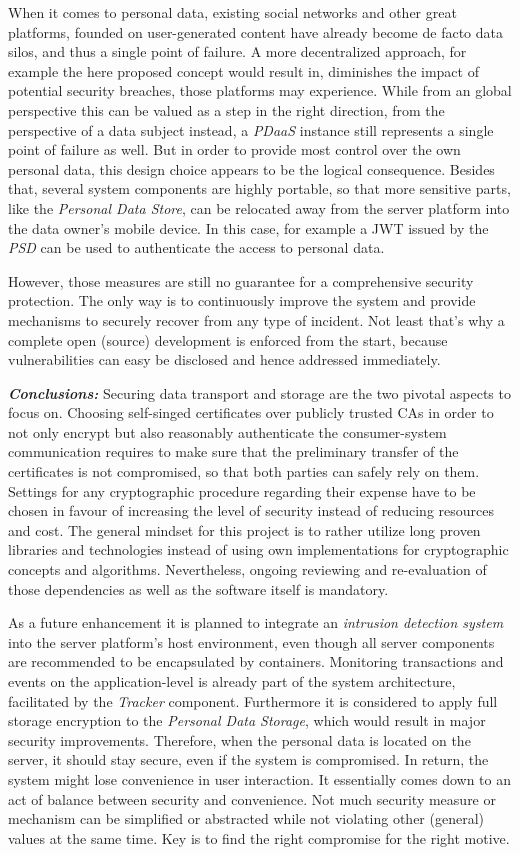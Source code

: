 \documentclass[12pt,english,a4paper,titlepage,cleardoublepage=empty,dottedtoc]{report}
\begin{document}
When it comes to personal data, existing social networks and other great
platforms, founded on user-generated content have already become de
facto data silos, and thus a single point of failure. A more
decentralized approach, for example the here proposed concept would
result in, diminishes the impact of potential security breaches, those
platforms may experience. While from an global perspective this can be
valued as a step in the right direction, from the perspective of a data
subject instead, a \emph{PDaaS} instance still represents a single point
of failure as well. But in order to provide most control over the own
personal data, this design choice appears to be the logical consequence.
Besides that, several system components are highly portable, so that
more sensitive parts, like the \emph{Personal Data Store}, can be
relocated away from the server platform into the data owner's mobile
device. In this case, for example a JWT issued by the \emph{PSD} can be
used to authenticate the access to personal data.

However, those measures are still no guarantee for a comprehensive
security protection. The only way is to continuously improve the system
and provide mechanisms to securely recover from any type of incident.
Not least that's why a complete open (source) development is enforced
from the start, because vulnerabilities can easy be disclosed and hence
addressed immediately.

\emph{\textbf{Conclusions:}} Securing data transport and storage are the
two pivotal aspects to focus on. Choosing self-singed certificates over
publicly trusted CAs in order to not only encrypt but also reasonably
authenticate the consumer-system communication requires to make sure
that the preliminary transfer of the certificates is not compromised, so
that both parties can safely rely on them. Settings for any
cryptographic procedure regarding their expense have to be chosen in
favour of increasing the level of security instead of reducing resources
and cost. The general mindset for this project is to rather utilize long
proven libraries and technologies instead of using own implementations
for cryptographic concepts and algorithms. Nevertheless, ongoing
reviewing and re-evaluation of those dependencies as well as the
software itself is mandatory.

As a future enhancement it is planned to integrate an \emph{intrusion
detection system} into the server platform's host environment, even
though all server components are recommended to be encapsulated by
containers. Monitoring transactions and events on the application-level
is already part of the system architecture, facilitated by the
\emph{Tracker} component. Furthermore it is considered to apply full
storage encryption to the \emph{Personal Data Storage}, which would
result in major security improvements. Therefore, when the personal data
is located on the server, it should stay secure, even if the system is
compromised. In return, the system might lose convenience in user
interaction. It essentially comes down to an act of balance between
security and convenience. Not much security measure or mechanism can be
simplified or abstracted while not violating other (general) values at
the same time. Key is to find the right compromise for the right motive.
\end{document}
